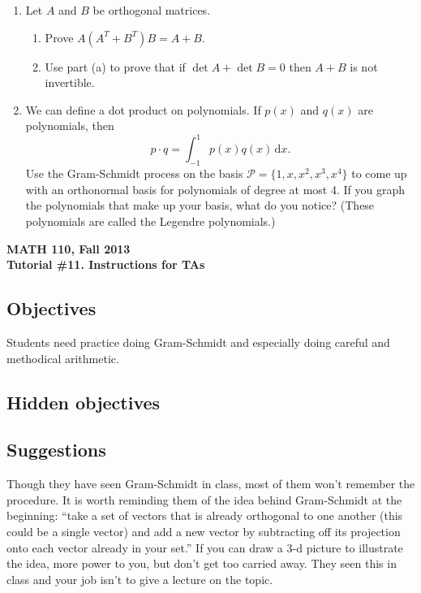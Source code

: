 \documentclass[11pt]{exam}
\newcommand{\mthCourse}{MATH 110}
\newcommand{\mthTerm}{Fall 2013}
\newcommand{\mthTutorialNumber}{11}
\begin{document}
\begin{enumerate}[resume]
	\item Let $A$ and $B$ be orthogonal matrices.
	\begin{enumerate}
		\item Prove $A(A^T+B^T)B=A+B$.
		\item Use part (a) to prove that if $\det A+\det B=0$ then $A+B$
			is not invertible.
	\end{enumerate}
	\item We can define a dot product on polynomials.  If $p(x)$ and
		$q(x)$ are polynomials, then \[\displaystyle 
		p\cdot q=\int_{-1}^1 p(x)q(x)\,\mathrm{d} x.\]
		Use the Gram-Schmidt process on the basis $\mathcal P=\{1,x,x^2,x^3,x^4\}$
		to come up with an orthonormal basis for polynomials of degree at most 4.
		If you graph the polynomials that make up your basis, what do you notice?
		(These polynomials are called the Legendre polynomials.)

\end{enumerate}



\newpage
{\small
	\begin{center}
		{\bf \mthCourse, \mthTerm}\\ 
		{\bf Tutorial \#\mthTutorialNumber. Instructions for TAs}
	\end{center}
}

\subsection*{Objectives}
	Students need practice doing Gram-Schmidt and especially doing
	careful and methodical arithmetic.


\subsection*{Hidden objectives}


\subsection*{Suggestions}
	Though they have seen Gram-Schmidt in class, most of them won't remember
	the procedure.  It is worth reminding them of the idea behind Gram-Schmidt
	at the beginning: ``take a set of vectors that is already orthogonal
	to one another (this could be a single vector) and add a new vector by subtracting
	off its projection onto each vector already in your set.''  If you can draw a 3-d picture
	to illustrate the idea, more power to you, but don't get too carried away.  They 
	seen this in class and your job isn't to give a lecture on the topic.
\end{document}
